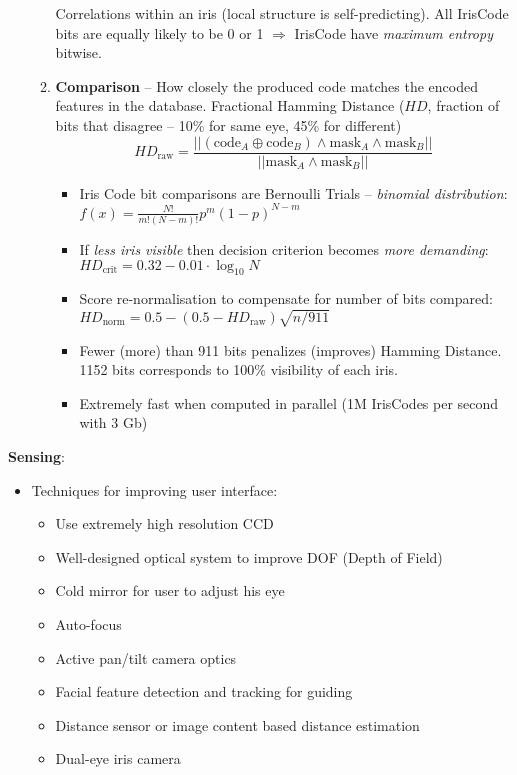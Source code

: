 \documentclass[a4paper]{article}
\begin{document}
\begin{itemize}
\begin{enumerate}
          Correlations within an iris (local structure is self-predicting). All IrisCode bits are equally likely to be 0 or 1 $\Rightarrow$ IrisCode  have \emph{maximum entropy} bitwise.
          \item \textbf{Comparison} -- How closely the produced code matches the encoded features in the database. Fractional Hamming Distance ($HD$, fraction of bits that disagree -- 10\% for same eye, 45\% for different)
            $$HD_\text{raw}=\frac{||(\text{code}_A \oplus\text{code}_B)\land \text{mask}_A\land \text{mask}_B||}{||\text{mask}_A\land \text{mask}_B||}$$
          \begin{itemize}
            \item Iris Code bit comparisons are Bernoulli Trials -- \emph{binomial distribution}:\\$f(x)=\frac{N!}{m!(N-m)!}p^m(1-p)^{N-m}$\\
            \item If \emph{less iris visible} then decision criterion becomes \emph{more demanding}:\\ $HD_\text{crit}=0.32-0.01\cdot\log_{10}{N}$
            \item Score re-normalisation to compensate for number of bits compared:\\$HD_\text{norm}=0.5-(0.5-HD_\text{raw})\sqrt{n/911}$
            \item Fewer (more) than 911 bits penalizes (improves) Hamming Distance. 1152 bits corresponds to 100\% visibility of each iris.
            \item Extremely fast when computed in parallel (1M IrisCodes per second with 3 Gb)
          \end{itemize}
        \end{enumerate}
      \end{itemize}

      \textbf{Sensing}:
      \begin{itemize}
        \item Techniques for improving user interface:
        \begin{itemize}
          \item Use extremely high resolution CCD 
          \item Well-designed optical system to improve DOF (Depth of Field)
          \item Cold mirror for user to adjust his eye
          \item Auto-focus
          \item Active pan/tilt camera optics
          \item Facial feature detection and tracking for guiding
          \item Distance sensor or image content based distance estimation
          \item Dual-eye iris camera
        \end{itemize}
      \end{itemize}
\end{document}
